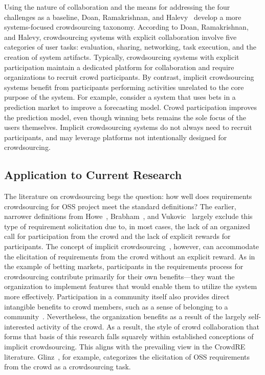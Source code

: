 Using the nature of collaboration and the means for addressing the four challenges as a baseline, Doan, Ramakrishnan, and Halevy~\cite{doan} develop a more systems-focused crowdsourcing taxonomy. According to Doan, Ramakrishnan, and Halevy, crowdsourcing systems with explicit collaboration involve five categories of user tasks: evaluation, sharing, networking, task execution, and the creation of system artifacts. Typically, crowdsourcing systems with explicit participation maintain a dedicated platform for collaboration and require organizations to recruit crowd participants. By contrast, implicit crowdsourcing systems benefit from participants performing activities unrelated to the core purpose of the system. For example, consider a system that uses bets in a prediction market to improve a forecasting model. Crowd participation improves the prediction model, even though winning bets remains the sole focus of the users themselves. Implicit crowdsourcing systems do not always need to recruit participants, and may leverage platforms not intentionally designed for crowdsourcing. 

\subsection{Application to Current Research}

The literature on crowdsourcing begs the question: how well does requirements crowdsourcing for OSS project meet the standard definitions? The earlier, narrower definitions from Howe~\cite{howe, howe2}, Brabham~\cite{brabham, brabham2}, and Vukovic~\cite{vukovic} largely exclude this type of requirement solicitation due to, in most cases, the lack of an organized call for participation from the crowd and the lack of explicit rewards for participants. The concept of implicit crowdsourcing~\cite{doan}, however, can accommodate the elicitation of requirements from the crowd without an explicit reward. As in the example of betting markets, participants in the requirements process for crowdsourcing contribute primarily for their own benefits---they want the organization to implement features that would enable them to utilize the system more effectively. Participation in a community itself also provides direct intangible benefits to crowd members, such as a sense of belonging to a community~\cite{levy}. Nevertheless, the organization benefits as a result of the largely self-interested activity of the crowd. As a result, the style of crowd collaboration that forms that basis of this research falls squarely within established conceptions of implicit crowdsourcing. This aligns with the prevailing view in the CrowdRE literature. Glinz~\cite{glinz}, for example, categorizes the elicitation of OSS requirements from the crowd as a crowdsourcing task.

